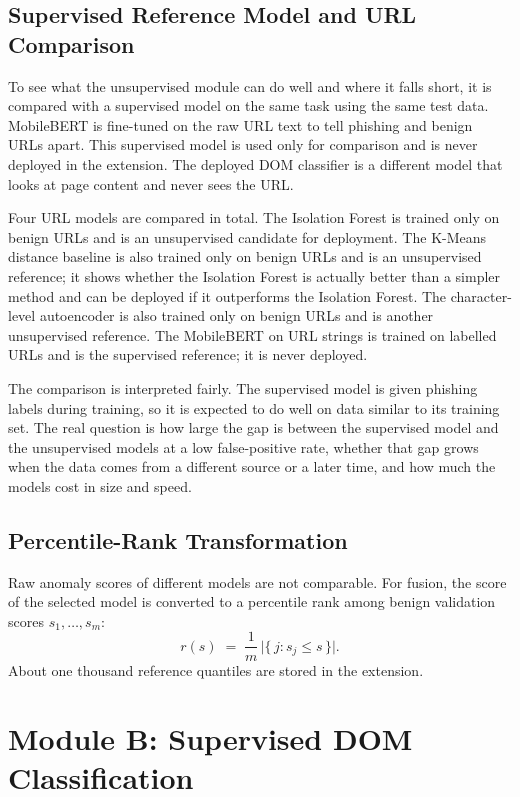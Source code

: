 \documentclass{FastFyp}
\begin{document}
\subsection{Supervised Reference Model and URL Comparison}
\label{sec:url-comparison}
To see what the unsupervised module can do well and where it falls short, it is compared with a supervised model on the same task using the same test data. MobileBERT is fine-tuned on the raw URL text to tell phishing and benign URLs apart. This supervised model is used only for comparison and is never deployed in the extension. The deployed DOM classifier is a different model that looks at page content and never sees the URL.

Four URL models are compared in total. The Isolation Forest is trained only on benign URLs and is an unsupervised candidate for deployment. The K-Means distance baseline is also trained only on benign URLs and is an unsupervised reference; it shows whether the Isolation Forest is actually better than a simpler method and can be deployed if it outperforms the Isolation Forest. The character-level autoencoder is also trained only on benign URLs and is another unsupervised reference. The MobileBERT on URL strings is trained on labelled URLs and is the supervised reference; it is never deployed.

The comparison is interpreted fairly. The supervised model is given phishing labels during training, so it is expected to do well on data similar to its training set. The real question is how large the gap is between the supervised model and the unsupervised models at a low false-positive rate, whether that gap grows when the data comes from a different source or a later time, and how much the models cost in size and speed.

\subsection{Percentile-Rank Transformation}
Raw anomaly scores of different models are not comparable. For fusion, the score of the selected model is converted to a percentile rank among benign validation scores $s_1,\dots,s_m$:
\begin{equation}
r(s) \;=\; \frac{1}{m}\,\bigl|\{\,j : s_j \le s\,\}\bigr| .
\end{equation}
About one thousand reference quantiles are stored in the extension.

\section{Module B: Supervised DOM Classification}
\label{sec:dom-module}
\end{document}
